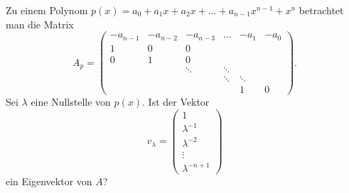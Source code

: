 Zu einem Polynom $p(x)=a_0+a_1x+a_2x+\dots+a_{n-1}x^{n-1}+x^n$ betrachtet
man die Matrix
\[
A_p=\begin{pmatrix}
-a_{n-1}&-a_{n-2}&-a_{n-3}& \dots&  -a_1&-a_0\\
       1&       0&       0&      &      &    \\
       0&       1&       0&      &      &    \\
        &        &  \ddots&\ddots&      &    \\
        &        &        &\ddots&\ddots&    \\
        &        &        &      &     1&   0
\end{pmatrix}.
\]
Sei $\lambda$ eine Nullstelle von $p(x)$. Ist der Vektor
\[
v_\lambda=\begin{pmatrix}
1\\\lambda^{-1}\\\lambda^{-2}\\\vdots\\\lambda^{-n+1}
\end{pmatrix}
\]
ein Eigenvektor von $A$?

